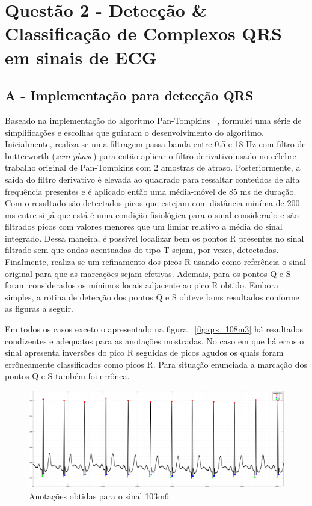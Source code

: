 \documentclass{article}
\begin{document}
\section*{Questão 2 - Detecção \& Classificação de Complexos QRS em sinais de ECG}
\subsection*{A - Implementação para detecção QRS}
Baseado na implementação do algoritmo Pan-Tompkins ~\cite{pan}, formulei uma série de simplificações e escolhas que guiaram o desenvolvimento do algoritmo. Inicialmente, realiza-se uma filtragem passa-banda entre 0.5 e 18 Hz com filtro de butterworth (\textit{zero-phase}) para então aplicar o filtro derivativo usado no célebre trabalho original de Pan-Tompkins com 2 amostras de atraso. Posteriormente, a saída do filtro derivativo é elevada ao quadrado para ressaltar conteúdos de alta frequência presentes e é aplicado então uma média-móvel de 85 ms de duração. Com o resultado são detectados picos que estejam com distância miníma de 200 ms entre si já que está é uma condição fisiológica para o sinal considerado e são filtrados picos com valores menores que um limiar relativo a média do sinal integrado. Dessa maneira, é possível localizar bem os pontos R presentes no sinal filtrado sem que ondas acentuadas do tipo T sejam, por vezes, detectadas. Finalmente, realiza-se um refinamento dos picos R usando como referência o sinal original para que as marcações sejam efetivas. Ademais, para os pontos Q e S foram considerados os mínimos locais adjacente ao pico R obtido. Embora simples, a rotina de detecção dos pontos Q e S obteve bons resultados conforme as figuras a seguir. 

Em todos os casos exceto o apresentado na figura ~\ref{fig:qrs_108m3} há resultados condizentes e adequatos para as anotações mostradas. No caso em que há erros o sinal apresenta inversões do pico R seguidas de picos agudos os quais foram errôneamente classificados como picos R. Para situação enunciada a marcação dos pontos Q e S também foi errônea.

\begin{figure}[H]
	\begin{center}
		\includegraphics[scale=0.3]{../qrs_103m6.png}
		\caption{Anotações obtidas para o sinal 103m6}
		\label{fig:qrs_103m6}
	\end{center}
\end{figure}  
\end{document}
